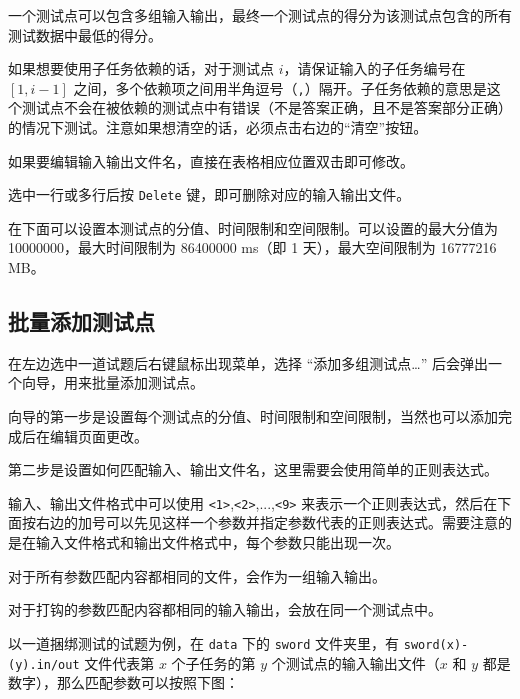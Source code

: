 \documentclass[UTF-8]{ctexart}
\begin{document}
			一个测试点可以包含多组输入输出，最终一个测试点的得分为该测试点包含的所有测试数据中最低的得分。
			
			如果想要使用子任务依赖的话，对于测试点 $i$，请保证输入的子任务编号在 $[1, i - 1]$ 之间，多个依赖项之间用半角逗号（\texttt{,}）隔开。子任务依赖的意思是这个测试点不会在被依赖的测试点中有错误（不是答案正确，且不是答案部分正确）的情况下测试。注意如果想清空的话，必须点击右边的“清空”按钮。
			
			如果要编辑输入输出文件名，直接在表格相应位置双击即可修改。
			
			选中一行或多行后按 \texttt{Delete} 键，即可删除对应的输入输出文件。
			
			在下面可以设置本测试点的分值、时间限制和空间限制。可以设置的最大分值为 10000000，最大时间限制为 86400000 ms（即 1 天），最大空间限制为 16777216 MB。
			
		\subsection{批量添加测试点}
		
			在左边选中一道试题后右键鼠标出现菜单，选择 “添加多组测试点…” 后会弹出一个向导，用来批量添加测试点。
			
			向导的第一步是设置每个测试点的分值、时间限制和空间限制，当然也可以添加完成后在编辑页面更改。
			
			第二步是设置如何匹配输入、输出文件名，这里需要会使用简单的正则表达式。
			
			输入、输出文件格式中可以使用 \texttt{<1>},\texttt{<2>},...,\texttt{<9>} 来表示一个正则表达式，然后在下面按右边的加号可以先见这样一个参数并指定参数代表的正则表达式。需要注意的是在输入文件格式和输出文件格式中，每个参数只能出现一次。
			
			对于所有参数匹配内容都相同的文件，会作为一组输入输出。
			
			对于打钩的参数匹配内容都相同的输入输出，会放在同一个测试点中。
			
			以一道捆绑测试的试题为例，在 \texttt{data} 下的 \texttt{sword} 文件夹里，有 \texttt{sword(x)-(y).in/out} 文件代表第 $x$ 个子任务的第 $y$ 个测试点的输入输出文件（$x$ 和 $y$ 都是数字），那么匹配参数可以按照下图：
			
\end{document}
